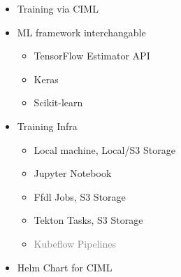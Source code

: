 \documentclass[aspectratio=169,11pt,hyperref={colorlinks=true}]{beamer}
\newcommand{\light}[1]{\textcolor{gray}{#1}}
\begin{document}
\begin{frame}
\begin{columns}
\begin{centering}
        \end{centering}
        \begin{itemize}
          \item{Training via CIML}
          \item{ML framework interchangable}
          \begin{itemize}
            \item{TensorFlow Estimator API}
            \item{Keras}
            \item{Scikit-learn}
          \end{itemize}
          \item{Training Infra}
          \begin{itemize}
            \item{Local machine, Local/S3 Storage}
            \item{Jupyter Notebook}
            \item{Ffdl Jobs, S3 Storage}
            \item{Tekton Tasks, S3 Storage}
            \item{\light{Kubeflow Pipelines}}
          \end{itemize}
          \item{Helm Chart for CIML}
        \end{itemize}
    \end{columns}
\end{frame}
\end{document}
